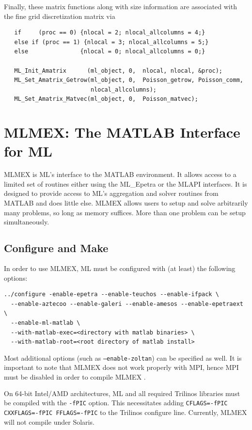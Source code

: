\documentclass{article}[11pt]
\begin{document}
\noindent
Finally, these matrix functions along with size information are associated with the
fine grid discretization matrix via
\begin{verbatim}
   if     (proc == 0) {nlocal = 2; nlocal_allcolumns = 4;}
   else if (proc == 1) {nlocal = 3; nlocal_allcolumns = 5;}
   else               {nlocal = 0; nlocal_allcolumns = 0;}

   ML_Init_Amatrix      (ml_object, 0,  nlocal, nlocal, &proc);
   ML_Set_Amatrix_Getrow(ml_object, 0,  Poisson_getrow, Poisson_comm, 
                         nlocal_allcolumns);
   ML_Set_Amatrix_Matvec(ml_object, 0,  Poisson_matvec);
\end{verbatim}



\section{MLMEX: The MATLAB Interface for ML} \label{sec:mlmex}
MLMEX is ML's interface to the MATLAB environment.  It allows access
to a limited set of routines either using the ML\_Epetra or the MLAPI
interfaces.  It is designed to provide access to ML's aggregation and
solver routines from MATLAB and does little else.  MLMEX allows users
to setup and solve arbitrarily many problems, so long as memory
suffices.  More than one problem can be setup simultaneously. 

\subsection{Configure and Make}\label{sec:mlmex:conf_make}
In order to use MLMEX, ML must be configured with (at least) the following options:
\begin{verbatim}
../configure -enable-epetra --enable-teuchos --enable-ifpack \
  --enable-aztecoo --enable-galeri --enable-amesos --enable-epetraext \
  --enable-ml-matlab \
  --with-matlab-exec=<directory with matlab binaries> \
  --with-matlab-root=<root directory of matlab install>
\end{verbatim}
Most additional options (such as \texttt{--enable-zoltan}) can be specified
as well.  It is important to note that MLMEX does not work properly
with MPI, hence MPI must be disabled in order to compile MLMEX .

On 64-bit Intel/AMD architectures, ML and all required Trilinos
libraries must be compiled with the \texttt{-fPIC} option.  This
necessitates adding \verb!CFLAGS=-fPIC CXXFLAGS=-fPIC FFLAGS=-fPIC! to
the Trilinos configure line.  Currently, MLMEX will not compile under
Solaris. 
\end{document}
